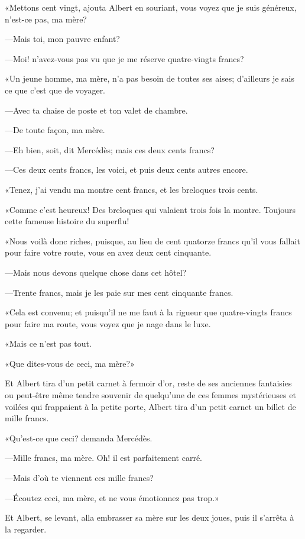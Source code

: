«Mettons cent vingt, ajouta Albert en souriant, vous voyez que je suis généreux, n'est-ce pas, ma mère? 

—Mais toi, mon pauvre enfant? 

—Moi! n'avez-vous pas vu que je me réserve quatre-vingts francs? 

«Un jeune homme, ma mère, n'a pas besoin de toutes ses aises; d'ailleurs je sais ce que c'est que de voyager. 

—Avec ta chaise de poste et ton valet de chambre. 

—De toute façon, ma mère. 

—Eh bien, soit, dit Mercédès; mais ces deux cents francs? 

—Ces deux cents francs, les voici, et puis deux cents autres encore. 

«Tenez, j'ai vendu ma montre cent francs, et les breloques trois cents. 

«Comme c'est heureux! Des breloques qui valaient trois fois la montre. Toujours cette fameuse histoire du superflu! 

«Nous voilà donc riches, puisque, au lieu de cent quatorze francs qu'il vous fallait pour faire votre route, vous en avez deux cent cinquante. 

—Mais nous devons quelque chose dans cet hôtel? 

—Trente francs, mais je les paie sur mes cent cinquante francs. 

«Cela est convenu; et puisqu'il ne me faut à la rigueur que quatre-vingts francs pour faire ma route, vous voyez que je nage dans le luxe. 

«Mais ce n'est pas tout. 

«Que dites-vous de ceci, ma mère?» 

Et Albert tira d'un petit carnet à fermoir d'or, reste de ses anciennes fantaisies ou peut-être même tendre souvenir de quelqu'une de ces femmes mystérieuses et voilées qui frappaient à la petite porte, Albert tira d'un petit carnet un billet de mille francs. 

«Qu'est-ce que ceci? demanda Mercédès. 

—Mille francs, ma mère. Oh! il est parfaitement carré. 

—Mais d'où te viennent ces mille francs? 

—Écoutez ceci, ma mère, et ne vous émotionnez pas trop.» 

Et Albert, se levant, alla embrasser sa mère sur les deux joues, puis il s'arrêta à la regarder. 

